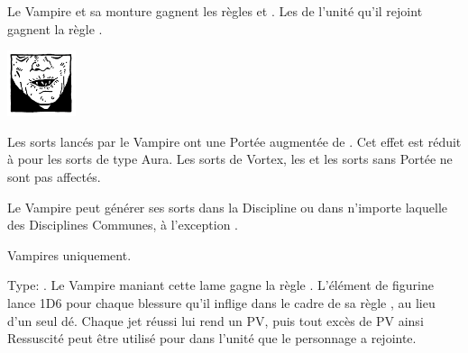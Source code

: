 \begin{multicols}{2}
 Le Vampire et sa monture gagnent les règles \poisonedattacks{} et . Les \ghouls{} de l'unité qu'il rejoint gagnent la règle \hatred{}.

\endpricelist

\begin{center}\includegraphics[width=2cm]{pics/logo_nosferatu.png}\end{center}
\vspace*{-1.5cm}

\vspace*{-0.2cm}
\startpricelist

 Les sorts lancés par le Vampire ont une Portée augmentée de . Cet effet est réduit à  pour les sorts de type Aura. Les sorts de Vortex, les \boundspells{} et les sorts sans Portée ne sont pas affectés.

 Le Vampire peut générer ses sorts dans la Discipline \necromancy{} ou dans n'importe laquelle des Disciplines Communes, à l'exception \nature{}.

\endpricelist

\vspace*{\fill}
\end{multicols}

\closearmynewsection









\startarmymagicalitems

\armymagicalweapons

\startpricelist

 Vampires uniquement.

Type: \hw{}. Le Vampire maniant cette lame gagne la règle . L'élément de figurine lance 1D6 pour chaque blessure qu'il inflige dans le cadre de sa règle \vampiric{}, au lieu d'un seul dé. Chaque jet \vampiric{} réussi lui rend un PV, puis tout excès de PV ainsi Ressuscité peut être utilisé pour \raisewounds{} dans l'unité que le personnage a rejointe.

